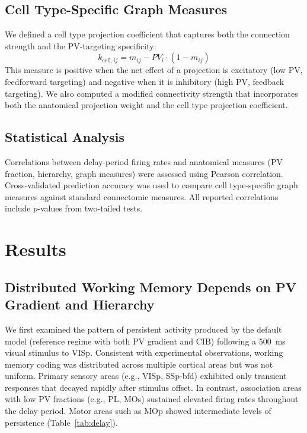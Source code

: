 \documentclass[11pt]{article}
\begin{document}
\subsection{Cell Type-Specific Graph Measures}

We defined a cell type projection coefficient that captures both the connection strength and the PV-targeting specificity:
\begin{equation}
k_{\text{cell},ij} = m_{ij} - PV_i \cdot (1 - m_{ij})
\end{equation}
This measure is positive when the net effect of a projection is excitatory (low PV, feedforward targeting) and negative when it is inhibitory (high PV, feedback targeting). We also computed a modified connectivity strength that incorporates both the anatomical projection weight and the cell type projection coefficient.

\subsection{Statistical Analysis}

Correlations between delay-period firing rates and anatomical measures (PV fraction, hierarchy, graph measures) were assessed using Pearson correlation. Cross-validated prediction accuracy was used to compare cell type-specific graph measures against standard connectomic measures. All reported correlations include $p$-values from two-tailed tests.

\section{Results}

\subsection{Distributed Working Memory Depends on PV Gradient and Hierarchy}

We first examined the pattern of persistent activity produced by the default model (reference regime with both PV gradient and CIB) following a 500~ms visual stimulus to VISp. Consistent with experimental observations, working memory coding was distributed across multiple cortical areas but was not uniform. Primary sensory areas (e.g., VISp, SSp-bfd) exhibited only transient responses that decayed rapidly after stimulus offset. In contrast, association areas with low PV fractions (e.g., PL, MOs) sustained elevated firing rates throughout the delay period. Motor areas such as MOp showed intermediate levels of persistence (Table~\ref{tab:delay}).
\end{document}
